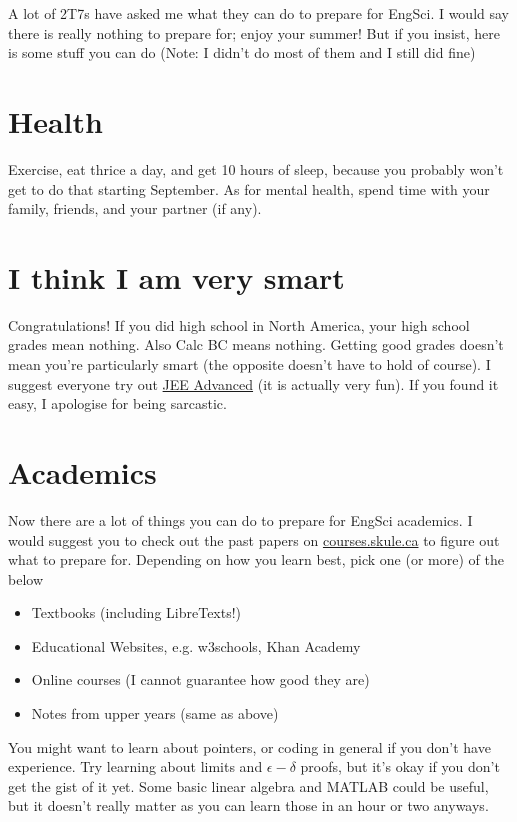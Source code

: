 A lot of 2T7s have asked me what they can do to prepare for EngSci. I would say there is really nothing to prepare for; enjoy your summer! But if you insist, here is some stuff you can do (Note: I didn't do most of them and I still did fine)

\section{Health}

Exercise, eat thrice a day, and get 10 hours of sleep, because you probably won't get to do that starting September. As for mental health, spend time with your family, friends, and your partner (if any).

\section{I think I am very smart}

Congratulations! If you did high school in North America, your high school grades mean nothing. Also Calc BC means nothing. Getting good grades doesn't mean you're particularly smart (the opposite doesn't have to hold of course). I suggest everyone try out \href{https://byjus.com/jee/jee-advanced-2022-question-paper/https://byjus.com/jee/jee-advanced-2022-question-paper/}{JEE Advanced} (it is actually very fun). If you found it easy, I apologise for being sarcastic.

\section{Academics}

Now there are a lot of things you can do to prepare for EngSci academics. I would suggest you to check out the past papers on \url{courses.skule.ca} to figure out what to prepare for. Depending on how you learn best, pick one (or more) of the below

\begin{itemize}
    \item Textbooks (including LibreTexts!)
    \item Educational Websites, e.g. w3schools, Khan Academy
    \item Online courses (I cannot guarantee how good they are)
    \item Notes from upper years (same as above)
\end{itemize}

You might want to learn about pointers, or coding in general if you don't have experience. Try learning about limits and $\epsilon-\delta$ proofs, but it's okay if you don't get the gist of it yet. Some basic linear algebra and MATLAB could be useful, but it doesn't really matter as you can learn those in an hour or two anyways.

